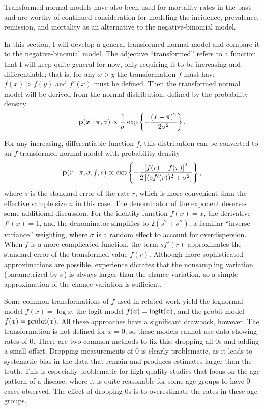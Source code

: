 Transformed normal models have also been used for mortality rates in
the
past\cite{girosi_demographic_2008,hogan_maternal_2010,rajaratnam_neonatal_2010}
and are worthy of continued consideration for modeling the incidence,
prevalence, remission, and mortality as an alternative to the
negative-binomial model.

In this section, I will develop a general transformed normal model
and compare it to the negative-binomial model.  The adjective
``transformed'' refers to a function that I will keep quite general
for now, only requiring it to be increasing and differentiable;
that is, for any $x > y$ the transformation $f$ must have $f(x) > f(y)$
and $f'(x)$ must be defined.  Then the transformed normal model will
be derived from the normal distribution, defined by the probability
density
\[
\mathbf{p}(x\;|\; \pi, \sigma)
 \propto \frac{1}{\sigma}
\exp\left\{ -\frac{(x-\pi)^2}{2\sigma^2} \right\}.
\]

For any increasing, differentiable function $f$, this distribution can
be converted to an $f$-transformed normal model with probability
density
\[
\mathbf{p}(r \;|\; \pi, \sigma, f, s) \propto
\exp\left\{-\frac{\left[f(r)-f(\pi)\right]^2}{2\left[(sf'(r))^2+\sigma^2\right]}\right\},
\]
where $s$ is the standard error of the rate $r$, which is more
convenient than the effective sample size $n$ in this case. The
denominator of the exponent deserves some additional discussion.  For
the identity function $f(x) = x$, the derivative $f'(x) = 1$, and the
denominator simplifies to $2(s^2 + \sigma^2)$, a familiar ``inverse
variance'' weighting, where $\sigma$ is a random effect to account for
overdispersion.  When $f$ is a more complicated function, the term
$sf'(r)$ approximates the standard error of the transformed value
$f(r)$.  Although more sophisticated approximations are possible,
experience dictates that the nonsampling variation (parametrized by
$\sigma$) is always larger than the chance variation, so a simple
approximation of the chance variation is sufficient.

Some common transformations of $f$ used in related work yield the
lognormal model $f(x) = \log x$, the logit model $f(x) = \operatorname{logit}(x)$,
and the probit model $f(x) = \operatorname{probit}(x)$.  All these approaches
have a significant drawback, however.  The transformation is not
defined for $x=0$, so these models cannot use data showing rates of
$0$. There are two common methods to fix this: dropping all $0$s
and adding a small offset.  Dropping measurements of $0$ is clearly
problematic, as it leads to systematic bias in the data that remain
and produces estimates larger than the truth.  This is especially
problematic for high-quality studies that focus on the age pattern of
a disease, where it is quite reasonable for some age groups to have
$0$ cases observed.  The effect of dropping $0$s is to overestimate
the rates in these age groups.

